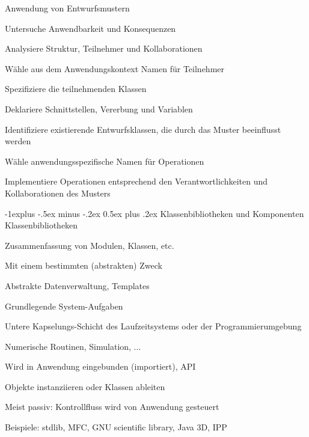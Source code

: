 \documentclass[a4paper]{article}
\makeatletter
\renewcommand{\subsection}{\@startsection{subsection}{2}{0mm}%
                                {-1explus -.5ex minus -.2ex}%
                                {0.5ex plus .2ex}%
                                {\normalfont\normalsize\bfseries}}
\makeatother
\begin{document}
\begin{multicols}{3}
  Anwendung von Entwurfsmustern
  \begin{itemize*}
    \item Untersuche Anwendbarkeit und Konsequenzen
    \item Analysiere Struktur, Teilnehmer und Kollaborationen
    \item Wähle aus dem Anwendungskontext Namen für Teilnehmer
    \item Spezifiziere die teilnehmenden Klassen
          \begin{itemize*}
            \item Deklariere Schnittstellen, Vererbung und Variablen
            \item Identifiziere existierende Entwurfsklassen, die durch das Muster beeinflusst werden
          \end{itemize*}
    \item Wähle anwendungsspezifische Namen für Operationen
    \item Implementiere Operationen entsprechend den Verantwortlichkeiten und Kollaborationen des Musters
  \end{itemize*}

  \subsection{Klassenbibliotheken und Komponenten}
  Klassenbibliotheken
  \begin{itemize*}
    \item Zusammenfassung von Modulen, Klassen, etc.
    \item Mit einem bestimmten (abstrakten) Zweck
          \begin{itemize*}
            \item Abstrakte Datenverwaltung, Templates
            \item Grundlegende System-Aufgaben
            \item Untere Kapselungs-Schicht des Laufzeitsystems oder der Programmierumgebung
            \item Numerische Routinen, Simulation, ...
          \end{itemize*}
    \item Wird in Anwendung eingebunden (importiert), API
          \begin{itemize*}
            \item Objekte instanziieren oder Klassen ableiten
          \end{itemize*}
    \item Meist passiv: Kontrollfluss wird von Anwendung gesteuert
    \item Beispiele: stdlib, MFC, GNU scientific library, Java 3D, IPP
  \end{itemize*}


\end{multicols}
\end{document}
